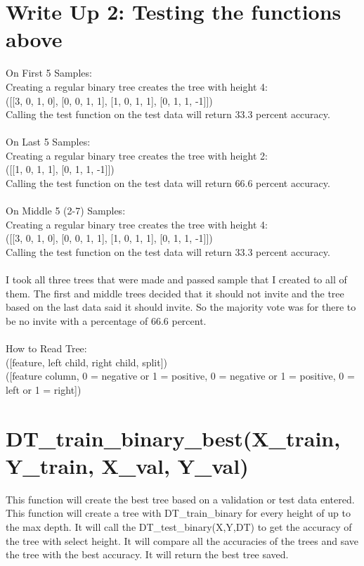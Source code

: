 \documentclass{article}
\begin{document}
\section{Write Up 2: Testing the functions above}
On First 5 Samples:\\
Creating a regular binary tree creates the tree with height 4: \\
([[3, 0, 1, 0], [0, 0, 1, 1], [1, 0, 1, 1], [0, 1, 1, -1]])\\
Calling the test function on the test data will return 33.3 percent accuracy.
\\\\
On Last 5 Samples:\\
Creating a regular binary tree creates the tree with height 2: \\
([[1, 0, 1, 1], [0, 1, 1, -1]])\\
Calling the test function on the test data will return 66.6 percent accuracy.
\\\\
On Middle 5 (2-7) Samples:\\
Creating a regular binary tree creates the tree with height 4: \\
([[3, 0, 1, 0], [0, 0, 1, 1], [1, 0, 1, 1], [0, 1, 1, -1]])\\
Calling the test function on the test data will return 33.3 percent accuracy.
\\\\
I took all three trees that were made and passed  sample that I created to all of them. The first and middle trees decided that it should not invite and the tree based on the last data said it should invite. So the majority vote was for there to be no invite with a percentage of 66.6 percent.\\
\\How to Read Tree: \\ ([feature, left child, right child, split])
\\([feature column, 0 = negative or 1 = positive, 0 = negative or 1 = positive, 0 = left or 1 = right])

\section{DT\_train\_binary\_best(X\_train, Y\_train, X\_val, Y\_val)}
This function will create the best tree based on a validation or test data entered. This function will create a tree with DT\_train\_binary for every height of up to the max depth. It will call the DT\_test\_binary(X,Y,DT) to get the accuracy of the tree with select height. It will compare all the accuracies of the trees and save the tree with the best accuracy. It will return the best tree saved.
\end{document}
